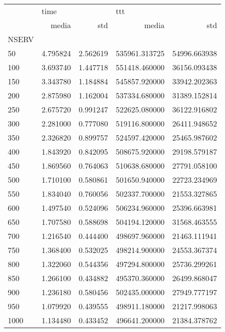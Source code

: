\begin{tabular}{lrrrr}
\toprule
{} & \multicolumn{2}{l}{time} & \multicolumn{2}{l}{ttt} \\
{} &     media &       std &          media &           std \\
NSERV &           &           &                &               \\
\midrule
50    &  4.795824 &  2.562619 &  535961.313725 &  54996.663938 \\
100   &  3.693740 &  1.447718 &  551418.460000 &  36156.093438 \\
150   &  3.343780 &  1.184884 &  545857.920000 &  33942.202363 \\
200   &  2.875980 &  1.162004 &  537334.680000 &  31389.152814 \\
250   &  2.675720 &  0.991247 &  522625.080000 &  36122.916802 \\
300   &  2.281000 &  0.777080 &  519116.800000 &  26411.948652 \\
350   &  2.326820 &  0.899757 &  524597.420000 &  25465.987602 \\
400   &  1.843920 &  0.842095 &  508675.920000 &  29198.579187 \\
450   &  1.869560 &  0.764063 &  510638.680000 &  27791.058100 \\
500   &  1.710100 &  0.580861 &  501650.940000 &  22723.234969 \\
550   &  1.834040 &  0.760056 &  502337.700000 &  21553.327865 \\
600   &  1.497540 &  0.524096 &  506234.960000 &  25396.663981 \\
650   &  1.707580 &  0.588698 &  504194.120000 &  31568.463555 \\
700   &  1.216540 &  0.444400 &  498697.960000 &  21463.111941 \\
750   &  1.368400 &  0.532025 &  498214.900000 &  24553.367374 \\
800   &  1.322060 &  0.544356 &  497294.800000 &  25736.299261 \\
850   &  1.266100 &  0.434882 &  495370.360000 &  26499.868047 \\
900   &  1.236180 &  0.580456 &  502435.000000 &  27949.777197 \\
950   &  1.079920 &  0.439555 &  498911.180000 &  21217.998063 \\
1000  &  1.134480 &  0.433452 &  496641.200000 &  21384.378762 \\
\bottomrule
\end{tabular}
